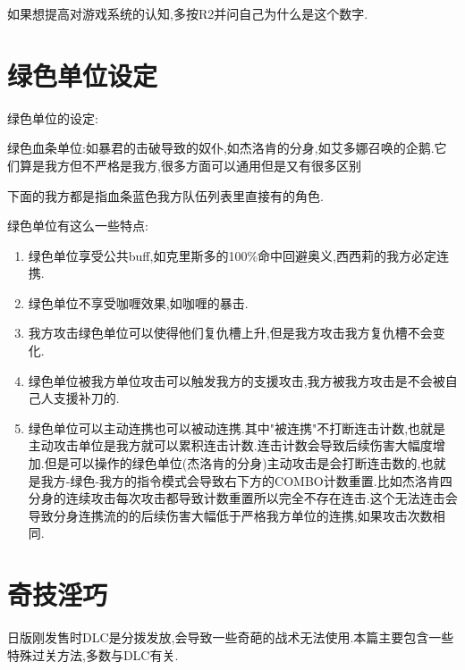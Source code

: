 	{\color{red}如果想提高对游戏系统的认知,多按R2并问自己为什么是这个数字.}

	\newpage

	\section{绿色单位设定}

	绿色单位的设定:

	绿色血条单位:如暴君的击破导致的奴仆,如杰洛肯的分身,如艾多娜召唤的企鹅.它们算是我方但不严格是我方,很多方面可以通用但是又有很多区别
	
	下面的我方都是指血条蓝色我方队伍列表里直接有的角色.

	绿色单位有这么一些特点:

	\begin{enumerate}
		\item 绿色单位享受公共buff,如克里斯多的100\%命中回避奥义,西西莉的我方必定连携.
		\item 绿色单位不享受咖喱效果,如咖喱的暴击.
		\item 我方攻击绿色单位可以使得他们复仇槽上升,但是我方攻击我方复仇槽不会变化.
		\item 绿色单位被我方单位攻击可以触发我方的支援攻击,我方被我方攻击是不会被自己人支援补刀的.
		\item 绿色单位可以主动连携也可以被动连携.其中"被连携"不打断连击计数,也就是主动攻击单位是我方就可以累积连击计数.连击计数会导致后续伤害大幅度增加.但是可以操作的绿色单位(杰洛肯的分身)主动攻击是会打断连击数的,也就是我方-绿色-我方的指令模式会导致右下方的COMBO计数重置.比如杰洛肯四分身的连续攻击每次攻击都导致计数重置所以完全不存在连击.这个无法连击会导致分身连携流的的后续伤害大幅低于严格我方单位的连携,如果攻击次数相同.
	\end{enumerate}


	\newpage

	\section{奇技淫巧}

	日版刚发售时DLC是分拨发放,会导致一些奇葩的战术无法使用.本篇主要包含一些特殊过关方法,多数与DLC有关.

